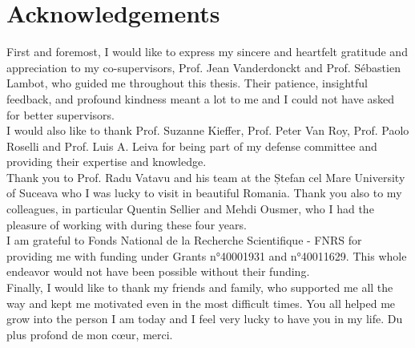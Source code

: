 \chapter*{Acknowledgements}

First and foremost, I would like to express my sincere and heartfelt gratitude and appreciation to my co-supervisors, Prof. Jean Vanderdonckt and Prof. Sébastien Lambot, who guided me throughout this thesis. Their patience, insightful feedback, and profound kindness meant a lot to me and I could not have asked for better supervisors.
\\

I would also like to thank Prof. Suzanne Kieffer, Prof. Peter Van Roy, Prof. Paolo Roselli and Prof. Luis A. Leiva for being part of my defense committee and providing their expertise and knowledge.
\\

Thank you to Prof. Radu Vatavu and his team at the Ștefan cel Mare University of Suceava who I was lucky to visit in beautiful Romania.
Thank you also to my colleagues, in particular Quentin Sellier and Mehdi Ousmer, who I had the pleasure of working with during these four years.
\\

I am grateful to Fonds National de la Recherche Scientifique - FNRS for providing me with funding under Grants n°40001931 and n°40011629. This whole endeavor would not have been possible without their funding.
\\

Finally, I would like to thank my friends and family, who supported me all the way and kept me motivated even in the most difficult times. You all helped me grow into the person I am today and I feel very lucky to have you in my life. Du plus profond de mon c\oe{}ur, merci.